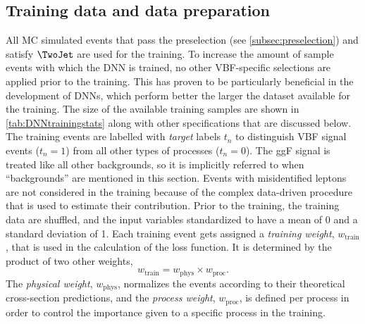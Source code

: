 

\subsection{Training data and data preparation}
\label{subsec:training-data}
All MC simulated events that pass the preselection (see \cref{subsec:preselection}) and satisfy $\TwoJet$ are used for the training. To increase the amount of sample events with which the DNN is trained, no other VBF-specific selections are applied prior to the training. This has proven to be particularly beneficial in the development of DNNs, which perform better the larger the dataset available for the training.
The size of the available training samples are shown in \cref{tab:DNNtrainingstats} along with other specifications that are discussed below.
The training events are labelled with \emph{target} labels $t_n$ to distinguish VBF signal events ($t_n = 1$) from all other types of processes ($t_n = 0$). 
The ggF signal is treated like all other backgrounds, so it is implicitly referred to when ``backgrounds'' are mentioned in this section.
Events with misidentified leptons are not considered in the training because of the complex data-driven procedure that is used to estimate their contribution.
Prior to the training, the training data are shuffled, and the input variables standardized to have a mean of 0 and a standard deviation of 1. 
Each training event gets assigned a \emph{training weight}, $w_\text{train}$, that is used in the calculation of the loss function. It is determined by the product of two other weights,
\begin{equation}
    w_\text{train} = w_\text{phys} \times w_\text{proc}.
\end{equation}
The \emph{physical weight}, $w_\text{phys}$, normalizes the events according to their theoretical cross-section predictions, and the \emph{process weight}, $w_\text{proc}$, is defined per process in order to control the importance given to a specific process in the training.
